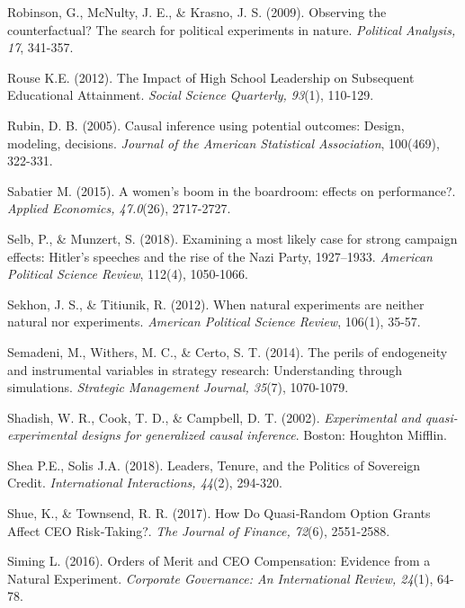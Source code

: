 \documentclass[english]{article}
\begin{document}
\begin{singlespace}
\begin{list}{}{\setlength\itemindent{-\leftmargin}}
\item Robinson, G., McNulty, J. E., \& Krasno, J. S. (2009). Observing the counterfactual? The search for political experiments in nature.  \emph{Political Analysis, 17}, 341-357.

\item *Rouse K.E. (2012). The Impact of High School Leadership on Subsequent Educational Attainment. \emph{Social Science Quarterly, 93}(1), 110-129.

\item Rubin, D. B. (2005). Causal inference using potential outcomes: Design, modeling, decisions. \emph{Journal of the American Statistical Association}, 100(469), 322-331.

\item *Sabatier M. (2015). A women's boom in the boardroom: effects on performance?. \emph{Applied Economics, 47.0}(26), 2717-2727.

\item Selb, P., \& Munzert, S. (2018). Examining a most likely case for strong campaign effects: Hitler's speeches and the rise of the Nazi Party, 1927--1933. \emph{American Political Science Review}, 112(4), 1050-1066.

\item Sekhon, J. S., \& Titiunik, R. (2012). When natural experiments are neither natural nor experiments. \emph{American Political Science Review}, 106(1), 35-57.

\item Semadeni, M., Withers, M. C., \& Certo, S. T. (2014). The perils of endogeneity and instrumental variables in strategy research: Understanding through simulations. \emph{Strategic Management Journal, 35}(7), 1070-1079.

\item Shadish, W. R., Cook, T. D., \& Campbell, D. T. (2002).  \emph{Experimental and quasi-experimental designs for generalized causal inference}. Boston: Houghton Mifflin.

\item *Shea P.E., Solis J.A. (2018). Leaders, Tenure, and the Politics of Sovereign Credit. \emph{International Interactions, 44}(2), 294-320.

\item *Shue, K., \& Townsend, R. R. (2017). How Do Quasi‐Random Option Grants Affect CEO Risk‐Taking?. \emph{The Journal of Finance, 72}(6), 2551-2588.

\item *Siming L. (2016). Orders of Merit and CEO Compensation: Evidence from a Natural Experiment. \emph{Corporate Governance: An International Review, 24}(1), 64-78.


\end{list}
\end{singlespace}
\end{document}
